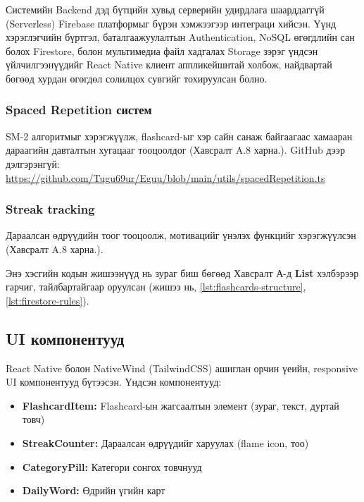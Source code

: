 Системийн Backend дэд бүтцийн хувьд серверийн удирдлага шаарддаггүй (Serverless) Firebase платформыг бүрэн хэмжээгээр интеграци хийсэн. Үүнд хэрэглэгчийн бүртгэл, баталгаажуулалтын Authentication, NoSQL өгөгдлийн сан болох Firestore, болон мультимедиа файл хадгалах Storage зэрэг үндсэн үйлчилгээнүүдийг React Native клиент аппликейшнтай холбож, найдвартай бөгөөд хурдан өгөгдөл солилцох сувгийг тохируулсан болно.

\figFirebaseAuth
\figFirebaseDB
\figFirebaseStorage

\subsubsection{Spaced Repetition систем}

SM-2 алгоритмыг хэрэгжүүлж, flashcard-ыг хэр сайн санаж байгаагаас хамааран дараагийн давталтын хугацааг тооцоолдог (Хавсралт A.8 харна.). GitHub дээр дэлгэрэнгүй: \url{https://github.com/Tugu69ur/Eguu/blob/main/utils/spacedRepetition.ts}

\subsubsection{Streak tracking}

Дараалсан өдрүүдийн тоог тооцоолж, мотивацийг үнэлэх функцийг хэрэгжүүлсэн (Хавсралт A.8 харна.).

Энэ хэсгийн кодын жишээнүүд нь зураг биш бөгөөд Хавсралт А-д \textbf{List} хэлбэрээр гарчиг, тайлбартайгаар оруулсан (жишээ нь, \ref{lst:flashcards-structure}, \ref{lst:firestore-rules}).

\subsection{UI компонентууд}
\label{subsec:ui-components}

React Native болон NativeWind (TailwindCSS) ашиглан орчин үеийн, responsive UI компонентууд бүтээсэн. Үндсэн компонентууд:

\begin{itemize}
    \item \textbf{FlashcardItem:} Flashcard-ын жагсаалтын элемент (зураг, текст, дуртай товч)
    \item \textbf{StreakCounter:} Дараалсан өдрүүдийг харуулах (flame icon, тоо)
    \item \textbf{CategoryPill:} Категори сонгох товчнууд
    \item \textbf{DailyWord:} Өдрийн үгийн карт
\end{itemize}


